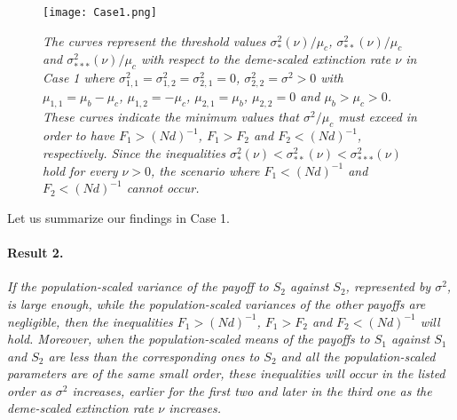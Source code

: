 \documentclass[11pt]{article}
\begin{document}
\begin{figure}[hbt!]
\texttt{[image: Case1.png]}
\caption{\textit{The curves represent the threshold values $\sigma^2_{*}(\nu)/\mu_c$, $\sigma^2_{**}(\nu)/\mu_c$ and $\sigma^2_{***}(\nu)/\mu_c$ with respect to the deme-scaled extinction rate $\nu$ in Case 1 where $\sigma^2_{1,1}=\sigma^2_{1,2}=\sigma^2_{2,1}=0$, $\sigma^2_{2,2}=\sigma^2>0$ with $\mu_{1,1}=\mu_b-\mu_c$, $\mu_{1,2}=-\mu_c$, $\mu_{2,1}=\mu_b$, $\mu_{2,2}=0$ and $\mu_b>\mu_c>0$. These curves indicate the minimum values that $\sigma_{}^2/\mu_c$ must exceed in order to have $F_1>(Nd)^{-1}$, $F_1 > F_2$ and  $F_2<(Nd)^{-1}$, respectively.
Since the inequalities 
$\sigma^2_{*}(\nu)<\sigma^2_{**}(\nu)<\sigma^2_{***}(\nu)$ hold for every $\nu>0$, the scenario where $F_1<(Nd)^{-1}$ and $F_2<(Nd)^{-1}$ cannot occur.
}}
\label{figure1}
\end{figure}

Let us summarize our findings in Case 1.


\paragraph{Result 2.}
\textit{
If the population-scaled variance of the payoff to $S_2$ against $S_2$, represented by $\sigma^2_{}$, is large enough, while the population-scaled variances  of the other payoffs are negligible, then the inequalities $F_1>(Nd)^{-1}$, $F_1 > F_2$ and $F_2<(Nd)^{-1}$ will hold. Moreover, when the population-scaled means of the payoffs to $S_1$ against $S_1$ and $S_2$ are less than the corresponding ones to $S_2$ and all the population-scaled parameters are of the same small order, these inequalities will occur in the listed order as $\sigma^2$ increases, earlier for the first two and later in the third one as the deme-scaled extinction rate $\nu$ increases.
}
\end{document}
